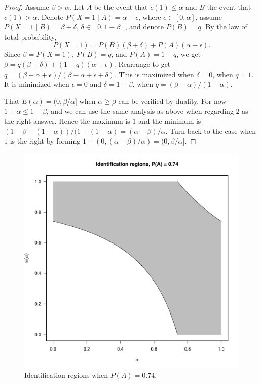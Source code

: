\begin{proof}
Assume $\beta>\alpha$. Let $A$ be the event that $c(1)\leq\alpha$
and $B$ the event that $c(1)>\alpha$. Denote $P(X=1\mid A)=\alpha-\epsilon$,
where $\epsilon\in[0,\alpha]$, assume $P(X=1\mid B)=\beta+\delta$,
$\delta\in[0,1-\beta]$, and denote $P(B)=q$. By the law of total
probability,
\[
P(X=1)=P(B)(\beta+\delta)+P(A)(\alpha-\epsilon).
\]
Since $\beta=P(X=1)$, $P(B)=q$, and $P(A)=1-q$, we get $\beta=q(\beta+\delta)+(1-q)(\alpha-\epsilon).$
Rearrange to get $q=(\beta-\alpha+\epsilon)/(\beta-\alpha+\epsilon+\delta)$.
This is maximized when $\delta=0$, when $q=1$. It is minimized when
$\epsilon=0$ and $\delta=1-\beta$, when $q=(\beta-\alpha)/(1-\alpha).$

That $E(\alpha)=(0,\beta/\alpha]$ when $\alpha\geq\beta$ can be verified by duality. For now $1-\alpha\leq 1-\beta$, and we can use the same analysis as above when regarding $2$ as the right answer. Hence the maximum is $1$ and the minimum is $(1-\beta-(1-\alpha))/(1-(1-\alpha)=(\alpha-\beta)/\alpha$. Turn back to the case when $1$ is the right by forming $1-(0,(\alpha-\beta)/\alpha)=(0,\beta/\alpha].$
\end{proof}
\begin{figure}
\noindent \begin{centering}
\includegraphics[scale=0.5]{chunks/knowing}
\par\end{centering}
\caption{\label{fig:Identification-regions-guessing}Identification regions
when $P(A)=0.74$.}
\end{figure}

